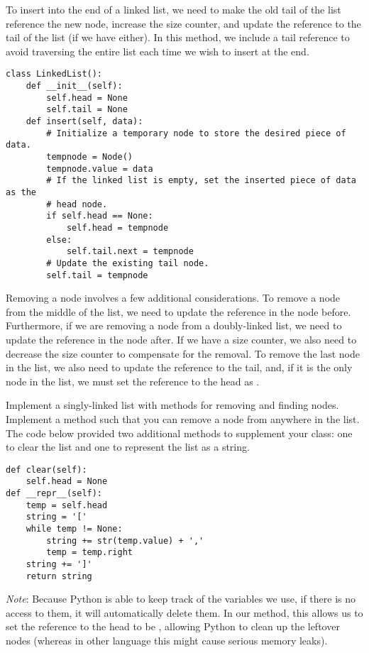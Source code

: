 To insert into the end of a linked list, we need to make the old tail of the list reference the new node, increase the size counter, and update the reference to the tail of the list (if we have either). In this method, we include a tail reference to avoid traversing the entire list each time we wish to insert at the end.

\begin{lstlisting}
class LinkedList():
    def __init__(self):
        self.head = None
        self.tail = None
    def insert(self, data):
        # Initialize a temporary node to store the desired piece of data.
        tempnode = Node()
        tempnode.value = data
        # If the linked list is empty, set the inserted piece of data as the 
        # head node.
        if self.head == None:
            self.head = tempnode
        else:
            self.tail.next = tempnode
        # Update the existing tail node.
        self.tail = tempnode
\end{lstlisting}

Removing a node involves a few additional considerations. 
To remove a node from the middle of the list, we need to update the reference in the node before. 
Furthermore, if we are removing a node from a doubly-linked list, we need to update the reference in the node after. 
If we have a size counter, we also need to decrease the size counter to compensate for the removal. 
To remove the last node in the list, we also need to update the reference to the tail, and, if it is the only node in the list, we must set the reference to the head as .

\begin{problem}
Implement a singly-linked list with methods for removing and finding nodes. Implement a method such that you can remove a node from anywhere in the list. The code below provided two additional methods to supplement your  class: one to clear the list and one to represent the list as a string.
\begin{lstlisting}
def clear(self):
    self.head = None
def __repr__(self):
    temp = self.head
    string = '['
    while temp != None:
        string += str(temp.value) + ','
        temp = temp.right
    string += ']'
    return string
\end{lstlisting}
\label{prob:LinkedLists}
\emph{Note}: Because Python is able to keep track of the variables we use, if there is no access to them, it will automatically delete them. In our  method, this allows us to set the reference to the head to be , allowing Python to clean up the leftover nodes (whereas in other language this might cause serious memory leaks).

\end{problem}


